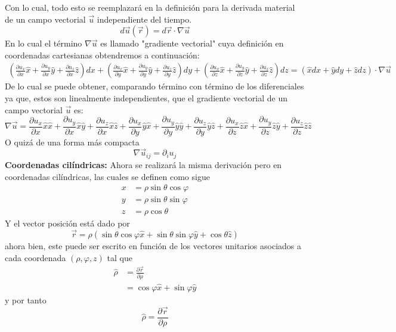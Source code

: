 \documentclass[11pt,letterpaper]{article}
\begin{document}
Con lo cual, todo esto se reemplazará en la definición para la derivada material de un campo vectorial $\vec{u}$ independiente del tiempo.
\begin{equation}
    d\vec{u}(\vec{r})=d\vec{r}\cdot\nabla\vec{u}
\end{equation}
En lo cual el término $\nabla\vec{u}$ es llamado "gradiente vectorial" cuya definición en coordenadas cartesianas obtendremos a continuación:
\begin{align*}
    \left(\frac{\partial u_x}{\partial x}\hat{x}+\frac{\partial u_y}{\partial x}\hat{y}+\frac{\partial u_z}{\partial x}\hat{z}\right)dx +\left(\frac{\partial u_x}{\partial y}\hat{x}+\frac{\partial u_y}{\partial y}\hat{y}+\frac{\partial u_z}{\partial y}\hat{z}\right)dy+\left(\frac{\partial u_x}{\partial z}\hat{x}+\frac{\partial u_y}{\partial z}\hat{y}+\frac{\partial u_z}{\partial z}\hat{z}\right)dz
  = (\hat{x}dx+\hat{y}dy+\hat{z}dz) \cdot \nabla \vec{u}
\end{align*}
De lo cual se puede obtener, comparando término con término de los diferenciales ya que, estos son linealmente independientes, que el gradiente vectorial de un campo vectorial $\vec{u}$ es:
\begin{equation}
    \nabla \vec{u}=\frac{\partial u_x}{\partial x}\hat{x}\hat{x}+\frac{\partial u_y}{\partial x}\hat{x}\hat{y}+\frac{\partial u_z}{\partial x}\hat{x}\hat{z} +\frac{\partial u_x}{\partial y}\hat{y}\hat{x}+\frac{\partial u_y}{\partial y}\hat{y}\hat{y}+\frac{\partial u_z}{\partial y}\hat{y}\hat{z}+\frac{\partial u_x}{\partial z}\hat{z}\hat{x}+\frac{\partial u_y}{\partial z}\hat{z}\hat{y}+\frac{\partial u_z}{\partial z}\hat{z}\hat{z}
\end{equation}
O quizá de una forma más compacta
\begin{equation}
    \nabla \vec{u}_{ij}=\partial_iu_j
\end{equation}
\textbf{Coordenadas cilíndricas:} Ahora se realizará la misma derivación pero en coordenadas cilíndricas, las cuales se definen como sigue 
\begin{align*}
    x & = \rho\sin{\theta}\cos{\varphi} \\
   y  & = \rho \sin{\theta}\sin{\varphi} \\
    z & = \rho \cos{\theta}
\end{align*}
Y el vector posición está dado por
\begin{equation}
    \vec{r}=\rho(\sin{\theta}\cos{\varphi}\hat{x}+\sin{\theta}\sin{\varphi}\hat{y}+\cos{\theta}\hat{z})
\end{equation}
ahora bien, este puede ser escrito en función de los vectores unitarios asociados a cada coordenada $(\rho,\varphi,z)$ tal que
\begin{align*}
    \hat{\rho}& =\frac{\partial \vec{r}}{\partial \rho} \\
& = \cos{\varphi}\hat{x} + \sin{\varphi}\hat{y}
\end{align*}
y por tanto
\begin{equation}
    \hat{\rho} = \frac{\partial \vec{r}}{\partial \rho }
\end{equation}
\end{document}
